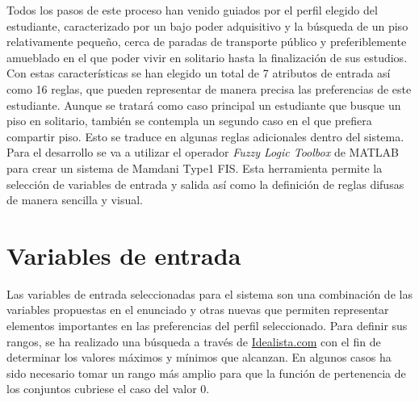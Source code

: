 \documentclass[12pt]{report} %
\begin{document}
        Todos los pasos de este proceso han venido guiados por el perfil
        elegido del estudiante, caracterizado por un bajo poder adquisitivo y
        la búsqueda de un piso relativamente pequeño, cerca de paradas de
        transporte público y preferiblemente amueblado en el que poder vivir en
        solitario hasta la finalización de sus estudios. Con estas
        características se han elegido un total de 7 atributos de entrada así
        como 16 reglas, que pueden representar de manera precisa las
        preferencias de este estudiante.  Aunque se tratará como caso principal
        un estudiante que busque un piso en solitario, también se contempla un
        segundo caso en el que prefiera compartir piso. Esto se traduce en
        algunas reglas adicionales dentro del sistema. Para el desarrollo se
        va a utilizar el operador \textit{Fuzzy Logic Toolbox} de MATLAB para
        crear un sistema de Mamdani Type1 FIS. Esta herramienta permite la
        selección de variables de entrada y salida así como la definición de
        reglas difusas de manera sencilla y visual.

    \section{Variables de entrada}

        Las variables de entrada seleccionadas para el sistema son una
        combinación de las variables propuestas en el enunciado y otras nuevas
        que permiten representar elementos importantes en las preferencias del
        perfil seleccionado. Para definir sus rangos, se ha realizado una
        búsqueda a través de \href{https://www.idealista.com/}{Idealista.com}
        con el fin de determinar los valores máximos y mínimos que alcanzan. En
        algunos casos ha sido necesario tomar un rango más amplio para que la
        función de pertenencia de los conjuntos cubriese el caso del valor 0.

\end{document}
